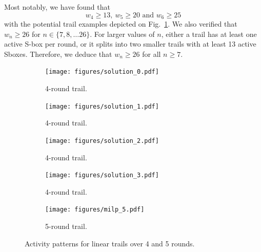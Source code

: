 Most notably, we have found that
\[w_4 \geq 13,\  w_5 \geq 20 \mbox{ and } w_6 \geq 25\]
with the potential trail examples depicted on Fig.~\ref{fig:trails}.
We also verified that \(w_n \geq 26\) for $n \in \{7, 8, \ldots 26\}$.
For larger values of $n$, either a trail has at least one active S-box per
round, or it splits into two smaller trails with at least 13 active
Sboxes.  Therefore, we deduce that \(w_n \ge 26\) for all $n \ge 7$.

\begin{figure}[h]
  \centering
  \begin{subfigure}[t]{0.22\textwidth}
    \centering
    \texttt{[image: figures/solution\_0.pdf]}
    \caption{4-round trail.}
  \end{subfigure}
  \hfill
  \begin{subfigure}[t]{0.22\textwidth}
    \centering
    \texttt{[image: figures/solution\_1.pdf]}
    \caption{4-round trail.}
  \end{subfigure}
  \hfill
  \begin{subfigure}[t]{0.22\textwidth}
    \centering
    \texttt{[image: figures/solution\_2.pdf]}
    \caption{4-round trail.}
  \end{subfigure}
  \hfill
  \begin{subfigure}[t]{0.22\textwidth}
    \centering
    \texttt{[image: figures/solution\_3.pdf]}
    \caption{4-round trail.}
  \end{subfigure}
  
  \begin{subfigure}[t]{0.45\textwidth}
    \centering
    \texttt{[image: figures/milp\_5.pdf]}
    \caption{5-round trail.}
  \end{subfigure}
  \caption{Activity patterns for linear trails over 4 and 5 rounds.}
  \label{fig:trails}
\end{figure}



